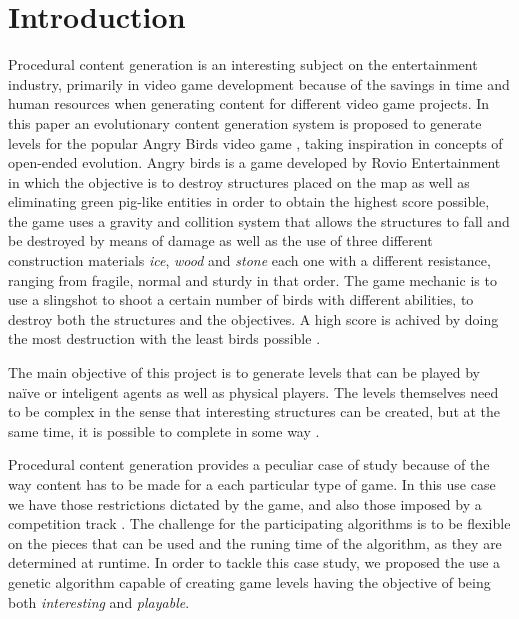 \documentclass[conference]{IEEEtran}
\begin{document}
\section{Introduction}
Procedural content generation is an interesting subject on the entertainment
industry, primarily in video game development because of the savings in 
time and human resources when generating content for different video game projects.
In this paper an evolutionary content generation system is proposed to generate
levels for the popular Angry Birds video game \cite{RovioEntertainmentCorporation2009},
taking inspiration in concepts of open-ended evolution. Angry birds is a game 
developed by Rovio Entertainment in which the objective is to destroy structures
placed on the map as well as eliminating
green pig-like entities in order to obtain the highest score possible, the game
uses a gravity and collition system that allows the structures to fall and be
destroyed by means of damage as well as the use of three different construction
materials \textit{ice}, \textit{wood} and \textit{stone} each one with a different
resistance, ranging from fragile, normal and sturdy in that order. The game
mechanic is to use a slingshot to shoot a certain number of birds with different
abilities, to destroy both the structures and the objectives. A high score 
is achived by doing the most destruction with the least birds possible 
\cite{RovioEntertainmentCorporation2009}.

The main objective of this project is to generate levels that can be played
by naïve or inteligent agents as well as physical players. The levels
themselves need to be complex in the sense that interesting structures can be
created, but at the same time, it is possible to complete in some way
\cite{Stephenson,Stephenson2018}.

Procedural content generation provides a peculiar case of study because of the way
content has to be made for a each particular type of game. In this use case 
we have those restrictions dictated by the game, and also 
those imposed by a competition track \cite{Renz}.%
The challenge for the participating algorithms is to be flexible on the  
pieces that can be used and the runing time of the algorithm, as they are determined at runtime. 
In order to tackle this case study, we proposed the use a genetic algorithm capable 
of creating game levels having the objective of being both \textit{interesting} and 
\textit{playable}.
\end{document}
